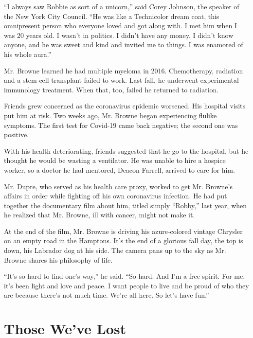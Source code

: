 ``I always saw Robbie as sort of a unicorn,'' said Corey Johnson, the
speaker of the New York City Council. ``He was like a Technicolor dream
coat, this omnipresent person who everyone loved and got along with. I
met him when I was 20 years old. I wasn't in politics. I didn't have any
money. I didn't know anyone, and he was sweet and kind and invited me to
things. I was enamored of his whole aura.''

Mr. Browne learned he had multiple myeloma in 2016. Chemotherapy,
radiation and a stem cell transplant failed to work. Last fall, he
underwent experimental immunology treatment. When that, too, failed he
returned to radiation.

Friends grew concerned as the coronavirus epidemic worsened. His
hospital visits put him at risk. Two weeks ago, Mr. Browne began
experiencing flulike symptoms. The first test for Covid-19 came back
negative; the second one was positive.

With his health deteriorating, friends suggested that he go to the
hospital, but he thought he would be wasting a ventilator. He was unable
to hire a hospice worker, so a doctor he had mentored, Deacon Farrell,
arrived to care for him.

Mr. Dupre, who served as his health care proxy, worked to get Mr.
Browne's affairs in order while fighting off his own coronavirus
infection. He had put together the documentary film about him, titled
simply ``Robby,'' last year, when he realized that Mr. Browne, ill with
cancer, might not make it.

At the end of the film, Mr. Browne is driving his azure-colored vintage
Chrysler on an empty road in the Hamptons. It's the end of a glorious
fall day, the top is down, his Labrador dog at his side. The camera pans
up to the sky as Mr. Browne shares his philosophy of life.

``It's so hard to find one's way,'' he said. ``So hard. And I'm a free
spirit. For me, it's been light and love and peace. I want people to
live and be proud of who they are because there's not much time. We're
all here. So let's have fun.''

\href{https://www.nytimes.com/interactive/2020/obituaries/people-died-coronavirus-obituaries.html?action=click\&pgtype=Article\&state=default\&region=BELOW_MAIN_CONTENT\&context=covid_obits_promo}{}

\hypertarget{those-weve-lost}{%
\section{Those We've Lost}\label{those-weve-lost}}

